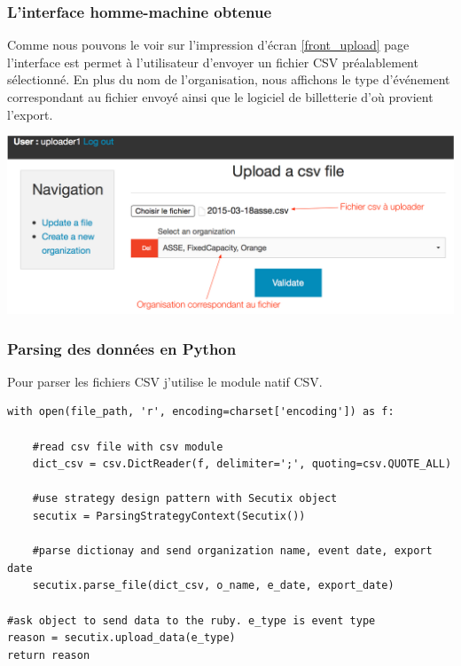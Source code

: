 \subsubsection{L'interface homme-machine obtenue}

Comme nous pouvons le voir sur l'impression d'écran \ref{front_upload} page \pageref{front_upload} l'interface est permet à l'utilisateur d'envoyer un fichier CSV préalablement sélectionné.
En plus du nom de l'organisation, nous affichons le type d'événement correspondant au fichier envoyé ainsi que le logiciel de billetterie d'où provient l'export. \\

\begin{center}
\includegraphics[scale=0.6]{images/front1.png}
\label{front_upload}
\end{center}

\subsubsection{Parsing des données en Python}
Pour parser les fichiers CSV j'utilise le module natif CSV.
\\


\lstset{style=custompython}
\begin{lstlisting}
with open(file_path, 'r', encoding=charset['encoding']) as f:

	#read csv file with csv module
	dict_csv = csv.DictReader(f, delimiter=';', quoting=csv.QUOTE_ALL)
	
	#use strategy design pattern with Secutix object
	secutix = ParsingStrategyContext(Secutix())	
	
	#parse dictionay and send organization name, event date, export date
	secutix.parse_file(dict_csv, o_name, e_date, export_date)

#ask object to send data to the ruby. e_type is event type 
reason = secutix.upload_data(e_type)
return reason
\end{lstlisting}

